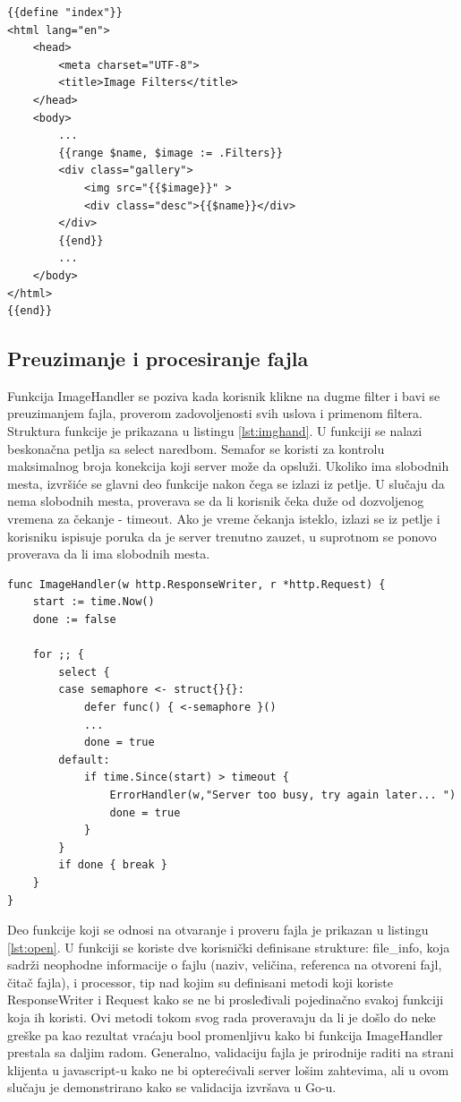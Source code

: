 \documentclass[12pt,oneside]{memoir}
\begin{document}
\begin{center}
\begin{lstlisting}[caption=Izvršavanje HTML šablona,label={lst:tmpl2},  backgroundcolor=\color{background},belowskip=-0.8 \baselineskip]
{{define "index"}}
<html lang="en">
	<head>
		<meta charset="UTF-8">
		<title>Image Filters</title>
	</head>
	<body>
		...
		{{range $name, $image := .Filters}}
		<div class="gallery">
			<img src="{{$image}}" >
			<div class="desc">{{$name}}</div>
		</div>
		{{end}}
		...
	</body>
</html>
{{end}}
\end{lstlisting}
\end{center}

\subsection{Preuzimanje i procesiranje fajla}

Funkcija ImageHandler se poziva kada korisnik klikne na dugme filter i bavi se preuzimanjem fajla, proverom zadovoljenosti svih uslova i primenom filtera. Struktura funkcije je prikazana u listingu \ref{lst:imghand}. U funkciji se nalazi beskonačna petlja sa select naredbom. Semafor se koristi za kontrolu maksimalnog broja konekcija koji server može da opsluži. Ukoliko ima slobodnih mesta, izvršiće se glavni deo funkcije nakon čega se izlazi iz petlje. U slučaju da nema slobodnih mesta, proverava se da li korisnik čeka duže od dozvoljenog vremena za čekanje - timeout.  Ako je vreme čekanja isteklo, izlazi se iz petlje i korisniku ispisuje poruka da je server trenutno zauzet, u suprotnom se ponovo proverava da li ima slobodnih mesta. 
 
\begin{center}
\begin{lstlisting}[caption=Struktura ImageHandler funkcije,label={lst:imghand},float,  backgroundcolor=\color{background},belowskip=-0.8 \baselineskip]
func ImageHandler(w http.ResponseWriter, r *http.Request) {
	start := time.Now()
	done := false

	for ;; {
		select {
		case semaphore <- struct{}{}:
			defer func() { <-semaphore }()
			...
			done = true
		default:
			if time.Since(start) > timeout {
				ErrorHandler(w,"Server too busy, try again later... ")
				done = true
			}
		}
		if done { break }
	}
}

\end{lstlisting}
\end{center}

 Deo funkcije koji se odnosi na otvaranje i proveru fajla je prikazan u listingu \ref{lst:open}. U funkciji se koriste dve korisnički definisane strukture: file\_info, koja sadrži neophodne informacije o fajlu (naziv, veličina, referenca na otvoreni fajl, čitač fajla), i processor, tip nad kojim su definisani metodi koji koriste ResponseWriter i Request kako se ne bi prosleđivali pojedinačno svakoj funkciji koja ih koristi. Ovi metodi tokom svog rada proveravaju da li je došlo do neke greške pa kao rezultat vraćaju bool promenljivu kako bi funkcija ImageHandler prestala sa daljim radom. Generalno, validaciju fajla je prirodnije raditi na strani klijenta u javascript-u kako ne bi opterećivali server lošim zahtevima, ali u ovom slučaju je demonstrirano kako se validacija izvršava u Go-u.
\end{document}
